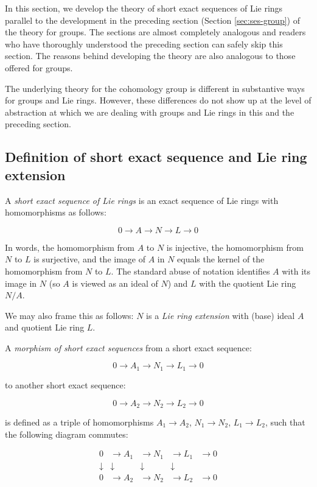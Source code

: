 In this section, we develop the theory of short exact sequences of Lie
rings parallel to the development in the preceding section (Section
\ref{sec:ses-group}) of the theory for groups. The sections are
almost completely analogous and readers who have thoroughly understood
the preceding section can safely skip this section. The reasons behind
developing the theory are also analogous to those offered for groups.

The underlying theory for the cohomology group is different in
substantive ways for groups and Lie rings. However, these differences
do not show up at the level of abstraction at which we are dealing
with groups and Lie rings in this and the preceding section.

\subsection{Definition of short exact sequence and Lie ring extension}

A {\em short exact sequence of Lie rings} is an exact sequence of Lie
rings with homomorphisms as follows:

$$0 \to A \to N \to L \to 0$$

In words, the homomorphism from $A$ to $N$ is injective, the
homomorphism from $N$ to $L$ is surjective, and the image of $A$ in
$N$ equals the kernel of the homomorphism from $N$ to $L$. The
standard abuse of notation identifies $A$ with its image in $N$ (so
$A$ is viewed as an ideal of $N$) and $L$ with the quotient
Lie ring $N/A$.

We may also frame this as follows: $N$ is a {\em Lie ring extension}
with (base) ideal $A$ and quotient Lie ring $L$.

A {\em morphism of short exact sequences} from a short exact sequence:

$$0 \to A_1 \to N_1 \to L_1 \to 0$$

to another short exact sequence:

$$0 \to A_2 \to N_2 \to L_2 \to 0$$

is defined as a triple of homomorphisms $A_1 \to A_2$, $N_1 \to N_2$,
$L_1 \to L_2$, such that the following diagram commutes:

$$\begin{array}{rrrrr}
  0 & \to A_1 & \to N_1 & \to L_1 & \to 0 \\
  \downarrow & \downarrow & \downarrow & \downarrow & \\
  0 & \to A_2 & \to N_2 & \to L_2 & \to 0 \\
\end{array}$$

